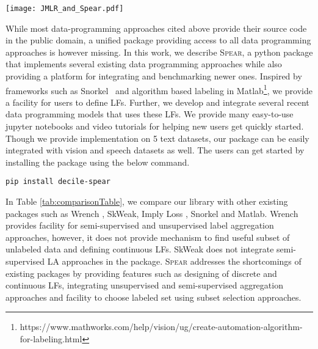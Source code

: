 \documentclass[11pt]{article}
\newcommand{\snuba} {\textsc{Snuba}}
\newcommand{\spear}{\mbox{\textsc{Spear}}}
\begin{document}
\begin{figure*}[!t]
    \centering
    \texttt{[image: JMLR\_and\_Spear.pdf]}
    \caption{Flow of the \textsc{SPEAR} library.}
    \label{fig:flow}
\end{figure*}

While most data-programming approaches cited above provide their source code in the public domain, a unified package providing access to all data programming approaches is however missing. In this work, we describe \spear, a python package that implements several existing data programming approaches while also providing a platform for integrating and benchmarking newer ones. Inspired by frameworks such as Snorkel~\citep{lison-etal-2021-skweak, ratner2017snorkel, zhang2021wrench} and %
algorithm based labeling in Matlab\footnote{https://www.mathworks.com/help/vision/ug/create-automation-algorithm-for-labeling.html}, we provide a facility for users to define LFs. Further, we develop and integrate several recent data programming models that uses these LFs. We provide many easy-to-use jupyter notebooks and video tutorials for helping new users get quickly started. Though we provide  implementation on 5 text datasets, our package can be easily integrated with vision and speech datasets as well. The users can get started by installing the package using the below command.
\begin{lstlisting}
pip install decile-spear
\end{lstlisting}
In Table \ref{tab:comparisonTable}, we compare our library with other existing packages such as Wrench \cite{zhang2021wrench}, SkWeak\cite{lison-etal-2021-skweak}, Imply Loss \cite{awasthi2020learning}, Snorkel \cite{bach2019snorkel} and Matlab. Wrench \cite{zhang2021wrench} provides facility for semi-supervised and unsupervised label aggregation approaches, however, it does not provide mechanism to find useful subset of unlabeled data and defining continuous LFs. SkWeak \cite{lison-etal-2021-skweak} does not integrate semi-supervised LA approaches in the package. \spear{} addresses the shortcomings of existing packages by providing features such as designing of discrete and continuous LFs, integrating unsupervised and semi-supervised aggregation approaches and facility to choose labeled set using subset selection approaches.
\end{document}
